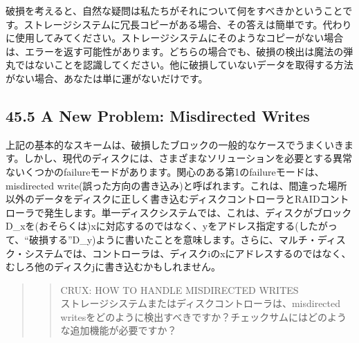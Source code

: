 破損を考えると、自然な疑問は私たちがそれについて何をすべきかということです。ストレージシステムに冗長コピーがある場合、その答えは簡単です。代わりに使用してみてください。ストレージシステムにそのようなコピーがない場合は、エラーを返す可能性があります。どちらの場合でも、破損の検出は魔法の弾丸ではないことを認識してください。他に破損していないデータを取得する方法がない場合、あなたは単に運がないだけです。

\hypertarget{a-new-problem-misdirected-writes}{%
\subsection*{45.5 A New Problem: Misdirected
Writes}\label{a-new-problem-misdirected-writes}}

上記の基本的なスキームは、破損したブロックの一般的なケースでうまくいきます。しかし、現代のディスクには、さまざまなソリューションを必要とする異常ないくつかのfailureモードがあります。関心のある第1のfailureモードは、misdirected
write(誤った方向の書き込み)と呼ばれます。これは、間違った場所以外のデータをディスクに正しく書き込むディスクコントローラとRAIDコントローラで発生します。単一ディスクシステムでは、これは、ディスクがブロックD\_xを(おそらくは)xに対応するのではなく、yをアドレス指定する(したがって、``破損する''D\_y)ように書いたことを意味します。さらに、マルチ・ディスク・システムでは、コントローラは、ディスクiのxにアドレスするのではなく、むしろ他のディスクjに書き込むかもしれません。

\begin{quote}
\begin{quote}
CRUX: HOW TO HANDLE MISDIRECTED WRITES\\
ストレージシステムまたはディスクコントローラは、misdirected
writesをどのように検出すべきですか？チェックサムにはどのような追加機能が必要ですか？
\end{quote}
\end{quote}

